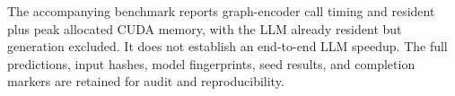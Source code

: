 The accompanying benchmark reports graph-encoder call timing and resident
plus peak allocated CUDA memory, with the LLM already resident but generation
excluded. It does not establish an end-to-end LLM speedup. The full predictions,
input hashes, model fingerprints, seed results, and completion markers are
retained for audit and reproducibility.
